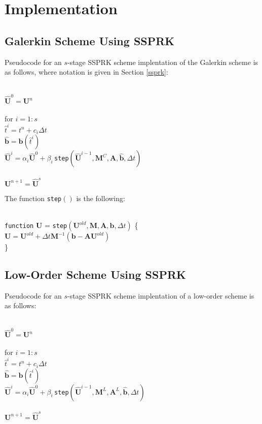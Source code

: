 \section{Implementation}
\subsection{Galerkin Scheme Using SSPRK}\label{gal_ssprk}
Pseudocode for an $s$-stage SSPRK scheme
implentation of the Galerkin scheme is as follows,
where notation is given in Section \ref{ssprk}:

{\noindent\\
$\hat{\mathbf{U}}^0 = \mathbf{U}^n$\\
\\
for $i=1:s$\\
\tab $\hat{t}^i = t^n+c_i\Delta t$\\
\tab $\hat{\mathbf{b}} = \mathbf{b}(\hat{t}^i)$\\
\tab $\hat{\mathbf{U}}^i = \alpha_i\hat{\mathbf{U}}^0
   + \beta_i\,$\texttt{step}$(\hat{\mathbf{U}}^{i-1},\mathbf{M}^C,
   \mathbf{A},\hat{\mathbf{b}},\Delta t)$\\
\\
$\mathbf{U}^{n+1} = \hat{\mathbf{U}}^s$\\
}

The function \texttt{step}$()$ is the following:

{\noindent\\
\texttt{function} $\mathbf{U}$ = \texttt{step}$(\mathbf{U}^{old},
   \mathbf{M},\mathbf{A},\mathbf{b},\Delta t)$ \{\\
\tab $\mathbf{U} = \mathbf{U}^{old} + \Delta t\mathbf{M}^{-1}
   (\mathbf{b} - \mathbf{A}\mathbf{U}^{old})$\\
\}\\
}
\subsection{Low-Order Scheme Using SSPRK}
Pseudocode for an $s$-stage SSPRK scheme
implentation of a low-order scheme is as follows:

{\noindent\\
$\hat{\mathbf{U}}^0 = \mathbf{U}^n$\\
\\
for $i=1:s$\\
\tab $\hat{t}^i = t^n+c_i\Delta t$\\
\tab $\hat{\mathbf{b}} = \mathbf{b}(\hat{t}^i)$\\
\tab $\hat{\mathbf{U}}^i = \alpha_i\hat{\mathbf{U}}^0
   + \beta_i\,$\texttt{step}$(\hat{\mathbf{U}}^{i-1},\mathbf{M}^L,
   \mathbf{A}^L,\hat{\mathbf{b}},\Delta t)$\\
\\
$\mathbf{U}^{n+1} = \hat{\mathbf{U}}^s$\\
}

